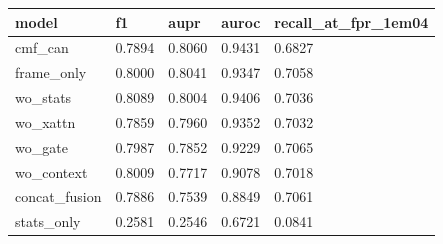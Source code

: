 \begin{tabular}{lllll}
\toprule
model & f1 & aupr & auroc & recall\_at\_fpr\_1em04 \\
\midrule
cmf\_can & 0.7894 & 0.8060 & 0.9431 & 0.6827 \\
frame\_only & 0.8000 & 0.8041 & 0.9347 & 0.7058 \\
wo\_stats & 0.8089 & 0.8004 & 0.9406 & 0.7036 \\
wo\_xattn & 0.7859 & 0.7960 & 0.9352 & 0.7032 \\
wo\_gate & 0.7987 & 0.7852 & 0.9229 & 0.7065 \\
wo\_context & 0.8009 & 0.7717 & 0.9078 & 0.7018 \\
concat\_fusion & 0.7886 & 0.7539 & 0.8849 & 0.7061 \\
stats\_only & 0.2581 & 0.2546 & 0.6721 & 0.0841 \\
\bottomrule
\end{tabular}
